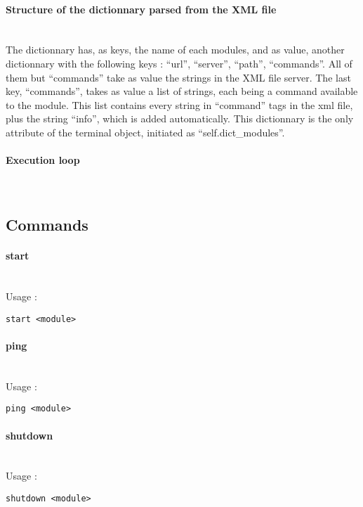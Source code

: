 \paragraph{Structure of the dictionnary parsed from the XML file} \hspace{0pt} \\
The dictionnary has, as keys, the name of each modules, and as value, another dictionnary with the following keys : ``url'', ``server'', ``path'', ``commands''. All of them but ``commands'' take as value the strings in the XML file server. The last key, ``commands'', takes as value a list of strings, each being a command available to the module. This list contains every string in ``command'' tags in the xml file, plus the string ``info'', which is added automatically. This dictionnary is the only attribute of the terminal object, initiated as ``self.dict\_modules''.

\paragraph{Execution loop} \hspace{0pt} \\

\subsection{Commands}
\paragraph{start} \hspace{0pt} \\
Usage :
\begin{verbatim}
start <module>
\end{verbatim}
\paragraph{ping} \hspace{0pt} \\
Usage :
\begin{verbatim}
ping <module>
\end{verbatim}
\paragraph{shutdown} \hspace{0pt} \\
Usage :
\begin{verbatim}
shutdown <module>
\end{verbatim}
